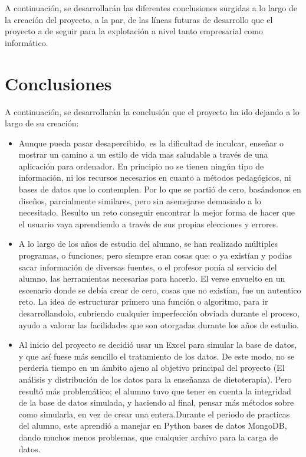 
A continuación, se desarrollarán las diferentes conclusiones surgidas a lo largo de la creación del proyecto, a la par, de las líneas futuras de desarrollo que el proyecto a de seguir para la explotación a nivel tanto empresarial como informático.
\\
\section{Conclusiones}
A continuación, se desarrollarán la conclusión que el proyecto ha ido dejando a lo largo de su creación:
\begin{itemize}
\item	Aunque pueda pasar desapercibido, es la dificultad de inculcar, enseñar o mostrar un camino a un estilo de vida mas saludable a través de una aplicación para ordenador. En principio no se tienen ningún tipo de información, ni los recursos necesarios en cuanto a métodos pedagógicos, ni bases de datos que lo contemplen. Por lo que se partió de cero, basándonos en diseños, parcialmente similares, pero sin asemejarse demasiado a lo necesitado. Resulto un reto conseguir encontrar la mejor forma de hacer que el usuario vaya aprendiendo a través de sus propias elecciones y errores.
\item	A lo largo de los años de estudio del alumno, se han realizado múltiples programas, o funciones, pero siempre eran cosas que: o ya existían y podías sacar información de diversas fuentes, o el profesor ponía al servicio del alumno, las herramientas necesarias para hacerlo. El verse envuelto en un escenario donde se debía crear de cero, cosas que no existían, fue un autentico reto. La idea de estructurar primero una función o algoritmo, para ir desarrollandolo, cubriendo cualquier imperfección obviada durante el proceso, ayudo a valorar las facilidades que son otorgadas durante los años de estudio.
\item	Al inicio del proyecto se decidió usar un Excel para simular la base de datos, y que así fuese más sencillo el tratamiento de los datos. De este modo, no se perdería tiempo en un ámbito ajeno al objetivo principal del proyecto (El análisis y distribución de los datos para la enseñanza de dietoterapia). Pero resultó más problemático; el alumno tuvo que tener en cuenta la integridad de la base de datos simulada, y haciendo al final, pensar más métodos sobre como simularla, en vez de crear una entera.Durante el periodo de practicas del alumno, este aprendió a manejar en Python bases de datos MongoDB, dando muchos menos problemas, que cualquier archivo para la carga de datos.

\end{itemize}
